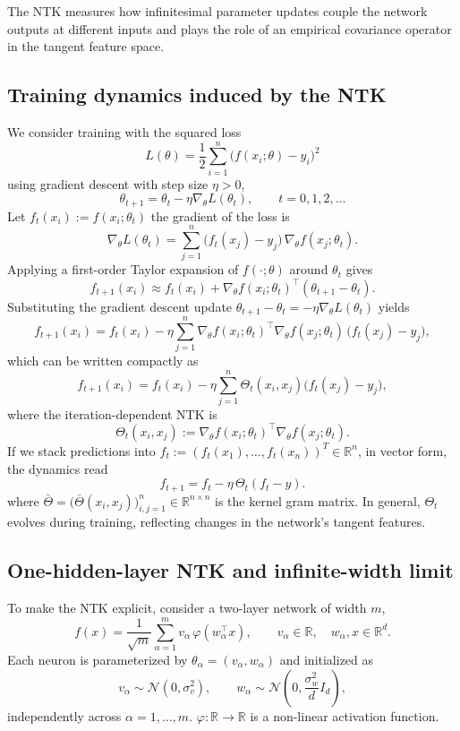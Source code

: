 The NTK measures how infinitesimal parameter updates couple the network outputs
at different inputs and plays the role of an empirical covariance operator in
the tangent feature space.

\subsection{Training dynamics induced by the NTK}

We consider training with the squared loss
\[
	L(\theta) = \frac{1}{2}\sum_{i=1}^n \bigl(f(x_i;\theta) - y_i\bigr)^2
\]
using gradient descent with step size $\eta>0$,
\[
	\theta_{t+1} = \theta_t - \eta \nabla_\theta L(\theta_t),
	\qquad t = 0,1,2,\dots
\]
Let $f_t(x_i) := f(x_i;\theta_t)$ the gradient of the loss is
\[
	\nabla_\theta L(\theta_t)
	=
	\sum_{j=1}^n \bigl(f_t(x_j)-y_j\bigr)\,\nabla_\theta f(x_j;\theta_t).
\]
Applying a first-order Taylor expansion of $f(\cdot;\theta)$ around $\theta_t$
gives
\[
	f_{t+1}(x_i)
	\approx
	f_t(x_i)
	+
	\nabla_\theta f(x_i;\theta_t)^\top(\theta_{t+1}-\theta_t).
\]
Substituting the gradient descent update
$\theta_{t+1}-\theta_t = -\eta \nabla_\theta L(\theta_t)$
yields
\[
	f_{t+1}(x_i)
	=
	f_t(x_i)
	-
	\eta
	\sum_{j=1}^n
	\nabla_\theta f(x_i;\theta_t)^\top
	\nabla_\theta f(x_j;\theta_t)\,
	\bigl(f_t(x_j)-y_j\bigr),
\]
which can be written compactly as
\begin{equation}
	f_{t+1}(x_i)
	=
	f_t(x_i)
	-
	\eta
	\sum_{j=1}^n
	\Theta_t(x_i,x_j)\bigl(f_t(x_j)-y_j\bigr),
	\label{eq:ntk-prediction-dynamics}
\end{equation}
where the iteration-dependent NTK is
\[
	\Theta_t(x_i,x_j)
	:=
	\nabla_\theta f(x_i;\theta_t)^\top
	\nabla_\theta f(x_j;\theta_t).
\]
If we stack predictions into
$f_t := (f_t(x_1),\dots,f_t(x_n))^T \in \mathbb{R}^n$, in vector form, the dynamics read
\begin{equation}
	f_{t+1} = f_t - \eta\,\Theta_t (f_t - y).
	\label{eq:ntk-vector-dynamics}
\end{equation}
where $
	\bar\Theta
	=
	\bigl(\bar\Theta(x_i,x_j)\bigr)_{i,j=1}^n
	\in \mathbb{R}^{n\times n}$ is the kernel gram matrix.
In general, $\Theta_t$ evolves during training, reflecting changes in the
network’s tangent features.

\subsection{One-hidden-layer NTK and infinite-width limit}

To make the NTK explicit, consider a two-layer network of width $m$,
\begin{equation}
	f(x)
	=
	\frac{1}{\sqrt{m}}
	\sum_{\alpha=1}^m
	v_\alpha\,\varphi(w_\alpha^\top x),
	\qquad
	v_\alpha \in \mathbb{R}, \quad w_\alpha, x \in \mathbb{R}^d.
	\label{eq:1hl-network}
\end{equation}
Each neuron is parameterized by $\theta_\alpha = (v_\alpha,w_\alpha)$ and
initialized as
\[
	v_\alpha \sim \mathcal{N}(0,\sigma_v^2),
	\qquad
	w_\alpha \sim \mathcal{N}\!\left(0,\frac{\sigma_w^2}{d}I_d\right),
\]
independently across $\alpha = 1,\dots,m$. $\varphi: \mathbb{R} \to \mathbb{R}$ is a non-linear activation function.

